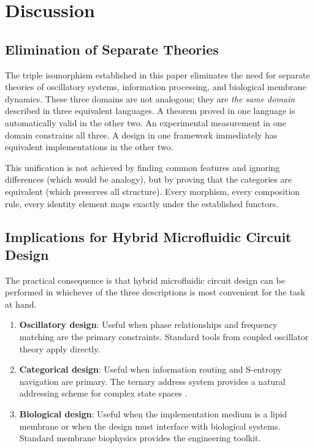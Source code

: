 \documentclass[twocolumn,10pt]{article}
\theoremstyle{remark}
\begin{document}
\section{Discussion}
\label{sec:discussion}

\subsection{Elimination of Separate Theories}

The triple isomorphism established in this paper eliminates the need for separate theories of oscillatory systems, information processing, and biological membrane dynamics.
These three domains are not analogous; they are \emph{the same domain} described in three equivalent languages.
A theorem proved in one language is automatically valid in the other two.
An experimental measurement in one domain constrains all three.
A design in one framework immediately has equivalent implementations in the other two.

This unification is not achieved by finding common features and ignoring differences (which would be analogy), but by proving that the categories are equivalent (which preserves all structure).
Every morphism, every composition rule, every identity element maps exactly under the established functors.

\subsection{Implications for Hybrid Microfluidic Circuit Design}

The practical consequence is that hybrid microfluidic circuit design can be performed in whichever of the three descriptions is most convenient for the task at hand.

\begin{enumerate}[label=(\roman*)]
    \item \textbf{Oscillatory design}: Useful when phase relationships and frequency matching are the primary constraints.
    Standard tools from coupled oscillator theory \cite{kuramoto1984,strogatz2015} apply directly.

    \item \textbf{Categorical design}: Useful when information routing and S-entropy navigation are primary.
    The ternary address system provides a natural addressing scheme for complex state spaces \cite{shannon1948,cover2006}.

    \item \textbf{Biological design}: Useful when the implementation medium is a lipid membrane or when the design must interface with biological systems.
    Standard membrane biophysics \cite{gennis1989,helfrich1973,lipowsky1995} provides the engineering toolkit.
\end{enumerate}
\end{document}
